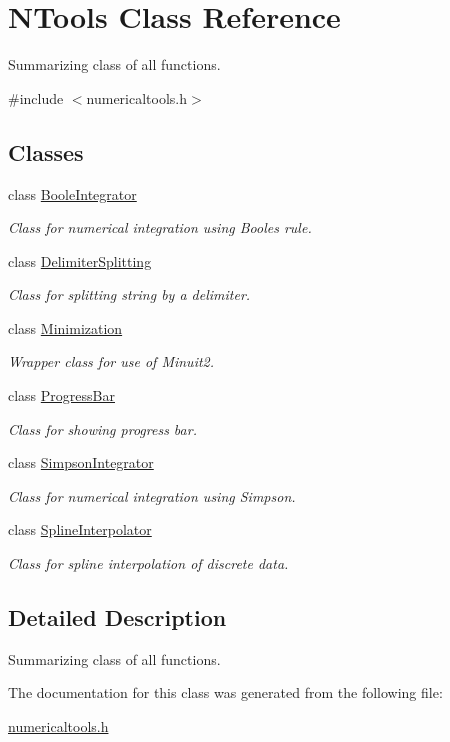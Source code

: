 \hypertarget{class_n_tools}{}\section{N\+Tools Class Reference}
\label{class_n_tools}


Summarizing class of all functions.  




{\ttfamily \#include $<$numericaltools.\+h$>$}

\subsection*{Classes}
\begin{DoxyCompactItemize}
\item 
class \mbox{\hyperlink{class_n_tools_1_1_boole_integrator}{Boole\+Integrator}}
\begin{DoxyCompactList}\small\item\em Class for numerical integration using Boole\textquotesingle{}s rule. \end{DoxyCompactList}\item 
class \mbox{\hyperlink{class_n_tools_1_1_delimiter_splitting}{Delimiter\+Splitting}}
\begin{DoxyCompactList}\small\item\em Class for splitting string by a delimiter. \end{DoxyCompactList}\item 
class \mbox{\hyperlink{class_n_tools_1_1_minimization}{Minimization}}
\begin{DoxyCompactList}\small\item\em Wrapper class for use of Minuit2. \end{DoxyCompactList}\item 
class \mbox{\hyperlink{class_n_tools_1_1_progress_bar}{Progress\+Bar}}
\begin{DoxyCompactList}\small\item\em Class for showing progress bar. \end{DoxyCompactList}\item 
class \mbox{\hyperlink{class_n_tools_1_1_simpson_integrator}{Simpson\+Integrator}}
\begin{DoxyCompactList}\small\item\em Class for numerical integration using Simpson. \end{DoxyCompactList}\item 
class \mbox{\hyperlink{class_n_tools_1_1_spline_interpolator}{Spline\+Interpolator}}
\begin{DoxyCompactList}\small\item\em Class for spline interpolation of discrete data. \end{DoxyCompactList}\end{DoxyCompactItemize}


\subsection{Detailed Description}
Summarizing class of all functions. 

The documentation for this class was generated from the following file\+:\begin{DoxyCompactItemize}
\item 
\mbox{\hyperlink{numericaltools_8h}{numericaltools.\+h}}\end{DoxyCompactItemize}

